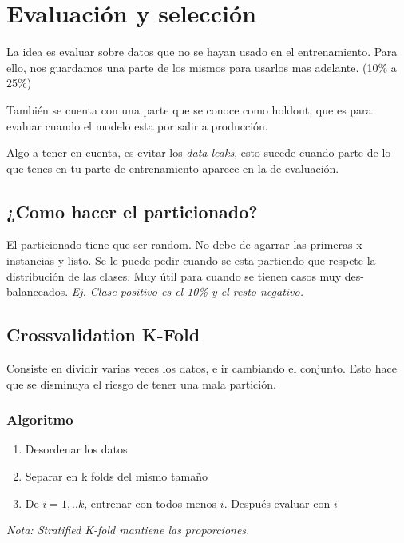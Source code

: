 \documentclass[titlepage,a4paper]{article}
\begin{document}


\section{Evaluación y selección}

La idea es evaluar sobre datos que no se hayan usado en el entrenamiento. Para ello, nos guardamos una parte de los mismos para usarlos mas adelante. (10\% a 25\%)

También se cuenta con una parte que se conoce como holdout, que es para evaluar cuando el modelo esta por salir a producción.

Algo a tener en cuenta, es evitar los \textit{data leaks}, esto sucede cuando parte de lo que tenes en tu parte de entrenamiento aparece en la de evaluación.

\subsection{¿Como hacer el particionado?}

El particionado tiene que ser random. No debe de agarrar las primeras x instancias y listo. Se le puede pedir cuando se esta partiendo que respete la distribución de las clases. Muy útil para cuando se tienen casos muy des-balanceados. \textit{Ej. Clase positivo es el 10\% y el resto negativo.}


\subsection{Crossvalidation K-Fold}

Consiste en dividir varias veces los datos, e ir cambiando el conjunto. Esto hace que se disminuya el riesgo de tener una mala partición.

\subsubsection*{Algoritmo}
\begin{enumerate}
    \item Desordenar los datos
    \item Separar en k folds del mismo tamaño
    \item De $i = 1,..k$, entrenar con todos menos $i$. Después evaluar con $i$  
\end{enumerate}

\textit{Nota: Stratified K-fold mantiene las proporciones.}
\end{document}
